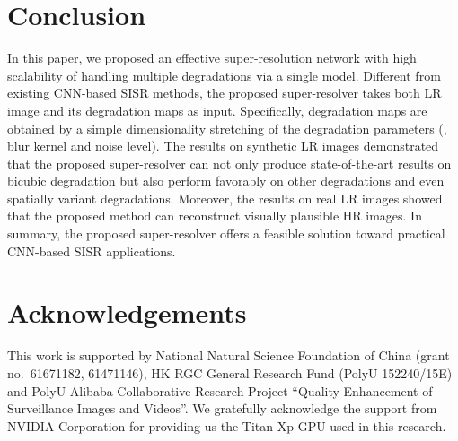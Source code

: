 \documentclass[10pt,twocolumn,letterpaper]{article}
\begin{document}
\section{Conclusion}

In this paper, we proposed an effective super-resolution network with high scalability of handling multiple degradations via a single model. Different from existing CNN-based SISR methods, the proposed super-resolver takes both LR image and its degradation maps as input. Specifically, degradation maps are obtained by a simple dimensionality stretching of the degradation parameters (\ie, blur kernel and noise level). The results on synthetic LR images demonstrated that the proposed super-resolver can not only produce state-of-the-art results on bicubic degradation but also perform favorably on other degradations and even spatially variant degradations. Moreover, the results on real LR images showed that the proposed method can reconstruct visually plausible HR images. In summary, the proposed super-resolver offers a feasible solution toward practical CNN-based SISR applications.



\section{Acknowledgements}

This work is supported by National Natural Science Foundation of China (grant no.~61671182, 61471146), HK RGC General Research
Fund (PolyU 152240/15E) and PolyU-Alibaba Collaborative
Research Project ``Quality Enhancement of Surveillance Images and Videos''.
We gratefully acknowledge the support from NVIDIA Corporation for providing us the Titan Xp GPU used in this research.





\clearpage

{\small


}
\end{document}
